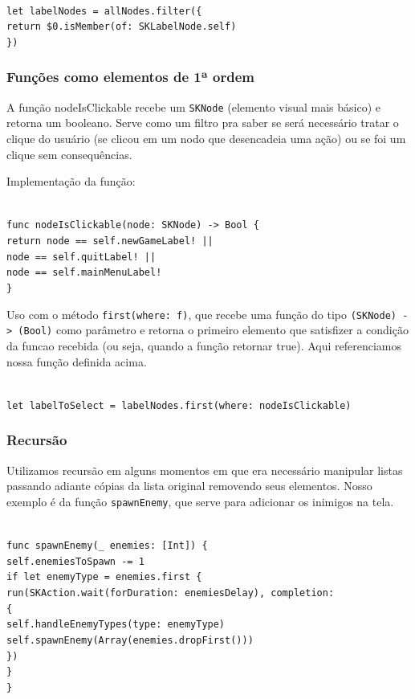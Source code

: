 \documentclass[rel_mlp]{iiufrgs}
\newcommand\tab[1][1cm]{\hspace*{#1}}
\begin{document}
\texttt{
\\let labelNodes = allNodes.filter(\{
\\\tab return \$0.isMember(of: SKLabelNode.self)
\\\})}


\subsubsection{Funções como elementos de 1ª ordem}

A função nodeIsClickable recebe um \texttt{SKNode} (elemento visual mais básico) e retorna um booleano. Serve como um filtro pra saber se será necessário tratar o clique do usuário (se clicou em um nodo que desencadeia uma ação) ou se foi um clique sem consequências.

Implementação da função:

\texttt{
\\func nodeIsClickable(node: SKNode) -> Bool \{
\\\tab return node == self.newGameLabel! ||
\\\tab\tab\tab node == self.quitLabel! ||
\\\tab\tab\tab node == self.mainMenuLabel!
\\\}}
    
Uso com o método \texttt{first(where: f)}, que recebe uma função do tipo \texttt{(SKNode) -> (Bool)} como parâmetro e retorna o primeiro elemento que satisfizer a condição da funcao recebida (ou seja, quando a função retornar true). Aqui referenciamos nossa função definida acima.

\texttt{\\let labelToSelect = labelNodes.first(where: nodeIsClickable)}


\subsubsection{Recursão}

Utilizamos recursão em alguns momentos em que era necessário manipular listas passando adiante cópias da lista original removendo seus elementos.
Nosso exemplo é da função \texttt{spawnEnemy}, que serve para adicionar os inimigos na tela.

\texttt{
\\func spawnEnemy(\_ enemies: [Int]) \{
\\\tab self.enemiesToSpawn -= 1
\\\tab if let enemyType = enemies.first \{
\\\tab\tab run(SKAction.wait(forDuration: enemiesDelay), completion:
\\\tab\tab \{
\\\tab\tab\tab self.handleEnemyTypes(type: enemyType)
\\\tab\tab\tab self.spawnEnemy(Array(enemies.dropFirst()))
\\\tab\tab \})
\\\tab \}
\\\}
}
\end{document}
